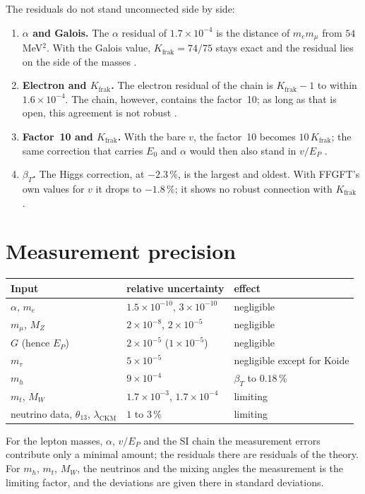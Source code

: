 The residuals do not stand unconnected side by side:
\begin{enumerate}[leftmargin=*,itemsep=2pt]
\item \textbf{$\alpha$ and Galois.} The $\alpha$ residual of $1.7\times10^{-4}$ is the distance of
  $m_em_\mu$ from $54$\,MeV$^2$. With the Galois value, $K_{\text{frak}}=74/75$ stays exact and the
  residual lies on the side of the masses \KM.
\item \textbf{Electron and $K_{\text{frak}}$.} The electron residual of the chain is
  $K_{\text{frak}}-1$ to within $1.6\times10^{-4}$. The chain, however, contains the factor~10;
  as long as that is open, this agreement is not robust \SM.
\item \textbf{Factor~10 and $K_{\text{frak}}$.} With the bare $v$, the factor~10 becomes
  $10\,K_{\text{frak}}$; the same correction that carries $E_0$ and $\alpha$ would then also stand
  in $v/E_P$ \SM.
\item \textbf{$\beta_T$.} The Higgs correction, at $-2.3\,\%$, is the largest and oldest. With
  FFGFT's own values for $v$ it drops to $-1.8\,\%$; it shows no robust connection with
  $K_{\text{frak}}$ \SM.
\end{enumerate}

\section{Measurement precision}

\begin{center}
\small
\begin{tabular}{@{}lll@{}}
\toprule
\textbf{Input} & \textbf{relative uncertainty} & \textbf{effect} \\
\midrule
$\alpha$, $m_e$ & $1.5\times10^{-10}$, $3\times10^{-10}$ & negligible \\
$m_\mu$, $M_Z$ & $2\times10^{-8}$, $2\times10^{-5}$ & negligible \\
$G$ (hence $E_P$) & $2\times10^{-5}$ ($1\times10^{-5}$) & negligible \\
$m_\tau$ & $5\times10^{-5}$ & negligible except for Koide \\
$m_h$ & $9\times10^{-4}$ & $\beta_T$ to $0.18\,\%$ \\
$m_t$, $M_W$ & $1.7\times10^{-3}$, $1.7\times10^{-4}$ & limiting \\
neutrino data, $\theta_{13}$, $\lambda_{\text{CKM}}$ & $1$ to $3\,\%$ & limiting \\
\bottomrule
\end{tabular}
\end{center}
For the lepton masses, $\alpha$, $v/E_P$ and the SI chain the measurement errors contribute only a
minimal amount; the residuals there are residuals of the theory. For $m_h$, $m_t$, $M_W$, the
neutrinos and the mixing angles the measurement is the limiting factor, and the deviations are
given there in standard deviations.

